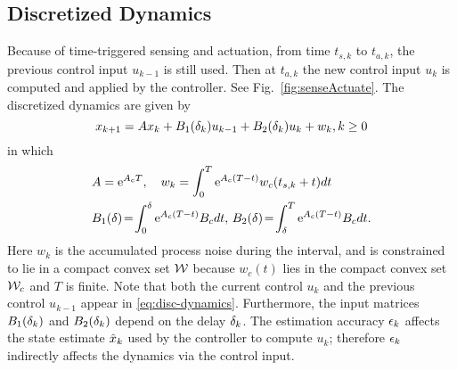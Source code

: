 \subsection{Discretized Dynamics}
Because of time-triggered sensing and actuation, from time $t_{s,k}$ to $t_{a,k}$, the  previous control input $u_{k-1}$
is still used.
Then at $t_{a,k}$ the new control input $u_{k}$
is computed and applied by the controller.
See Fig.~\ref{fig:senseActuate}.
The discretized dynamics are given by
\begin{equation}
\label{eq:disc-dynamics}
x_{k+1}=Ax_{k}+B_{1}(\delta_k)u_{k-1}+B_{2}(\delta_k)u_{k}+w_{k}, k\geq0
\end{equation}
in which
\begin{eqnarray*}
&A=\eu^{A_{c}T}, \quad
w_{k}%
=\int_{0}^{T}\eu^{A_{c}(T-t)}w_{c}(t_{s,k}+t) dt
\\
&B_{1}(\sDelay)%
\!=\!\int_{0}^{\sDelay}\eu^{A_{c}(T-t)}B_{c} dt,\,
B_{2}(\sDelay)%
\!=\!\int_{\sDelay}^{T}\eu^{A_{c}(T-t)}B_{c} dt \text.
\end{eqnarray*}
Here $w_{k}$ is the accumulated process noise during the interval, and is constrained to lie in a compact convex set $\mathcal{W}$ because $w_c(t)$ lies in the compact convex set $\mathcal{W}_c$ and $T$ is finite.
Note that both the current control $u_{k}$ and the previous
control $u_{k-1}$ appear in \eqref{eq:disc-dynamics}.
Furthermore, the input matrices $B_{1}(\delta_k)$ and $B_{2}(\delta_k)$
depend on the delay $\delta_k$.
The estimation accuracy $\epsilon_k$ affects the state estimate
$\hat{x}_{k}$ %
used by the controller to compute $u_{k}$;
therefore $\epsilon_k$ indirectly affects the dynamics via the control
input.







